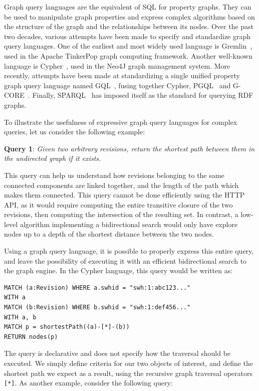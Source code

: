 Graph query languages are the equivalent of SQL for property graphs. They can
be used to manipulate graph properties and express complex algorithms based on
the structure of the graph and the relationships between its nodes. Over the
past two decades, various attempts have been made to specify and standardize
graph query languages. One of the earliest and most widely used language is
Gremlin~\cite{rodriguez2015gremlin}, used in the Apache TinkerPop graph
computing framework. Another well-known language is
Cypher~\cite{francis2018cypher}, used in the Neo4J graph management system.
More recently, attempts have been made at standardizing a single unified property
graph query language named GQL~\cite{michels2017standardizing}, fusing together
Cypher, PGQL~\cite{van2016pgql} and G-CORE~\cite{angles2018g}. Finally,
SPARQL~\cite{perez2009semantics} has imposed itself as the standard for
querying \gls{RDF} graphs.

To illustrate the usefulness of expressive graph query languages for complex
queries, let us consider the following example:

\textbf{Query 1}: \emph{Given two arbitrary revisions, return the shortest path
between them in the undirected graph if it exists.}

This query can help us understand how revisions belonging to the same connected
components are linked together, and the length of the path which makes them
connected. This query cannot be done efficiently using the HTTP API, as it
would require computing the entire transitive closure of the two revisions,
then computing the intersection of the resulting set. In contrast, a low-level
algorithm implementing a bidirectional search would only have explore nodes up
to a depth of the shortest distance between the two nodes.

Using a graph query language, it is possible to properly express this entire
query, and leave the possibility of executing it with an efficient
bidirectional search to the graph engine. In the Cypher language, this query
would be written as:

\begin{verbatim}
MATCH (a:Revision) WHERE a.swhid = "swh:1:abc123..."
WITH a
MATCH (b:Revision) WHERE b.swhid = "swh:1:def456..."
WITH a, b
MATCH p = shortestPath((a)-[*]-(b))
RETURN nodes(p)
\end{verbatim}

The query is declarative and does not specify how the traversal should be
executed. We simply define criteria for our two objects of interest, and
define the shortest path we expect as a result, using the recursive graph
traversal operators \texttt{[*]}.
As another example, consider the following query:

